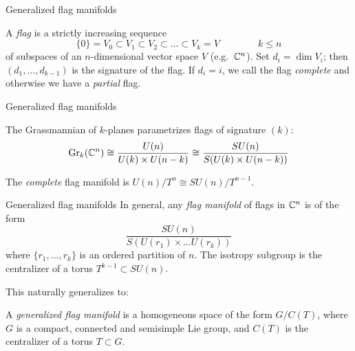 \documentclass[11pt,parskip]{beamer}
\begin{document}
\begin{frame}{Generalized flag manifolds}
	\begin{mydef}
		A \emph{flag} is a strictly increasing sequence 
		\begin{equation*}
			\{0\}=V_0\subset V_1 \subset V_2 \subset \dots \subset V_k=V \qquad \qquad k\leq n
		\end{equation*}
		of subspaces of an $n$-dimensional vector space $V$ (e.g.~$\mathbb{C}^n$). Set $d_i=\dim V_i$; then $(d_1,\dots, d_{k-1})$ is the signature of the flag. If $d_i=i$, we call the flag \emph{complete} and otherwise we have a \emph{partial} flag. 
	\end{mydef}	
\end{frame}
\begin{frame}{Generalized flag manifolds}
	\begin{ex}
		\begin{letteredlist}
			\item The Grassmannian of $k$-planes parametrizes flags of signature $(k)$:
			\begin{equation*}
				\operatorname{Gr}_k(\mathbb{C}^n)\cong \frac{U(n)}{U(k)\times U(n-k)} 
				\cong \frac{SU(n)}{S(U(k)\times U(n-k))}
			\end{equation*}\pause
			\item The \emph{complete} flag manifold is $U(n)/T^n\cong SU(n)/T^{n-1}$.
		\end{letteredlist}
	\end{ex}
\end{frame}
\begin{frame}{Generalized flag manifolds}
	In general, any \emph{flag manifold} of flags in $\mathbb{C}^n$ is of the form
	\begin{equation*}
		\frac{SU(n)}{S(U(r_1)\times\dots U(r_k))}
	\end{equation*}
	where $\{r_1,\dots,r_k\}$ is an ordered partition of $n$. The isotropy subgroup is the centralizer of a torus $T^{k-1}\subset SU(n)$.\pause
	\bigskip
	
	This naturally generalizes to:

	\begin{mydef}
		A \emph{generalized flag manifold} is a homogeneous space of the form $G/C(T)$, where $G$ is a compact, connected and semisimple Lie group, and $C(T)$ is the centralizer of a torus $T\subset G$.
	\end{mydef}
\end{frame}
\end{document}
